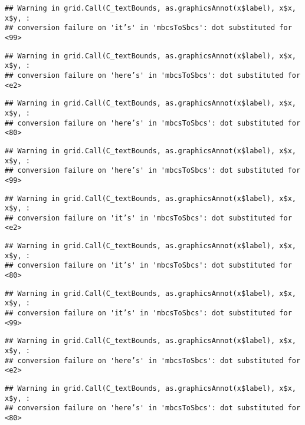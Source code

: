 \documentclass[
]{article}
\begin{document}
\begin{verbatim}
## Warning in grid.Call(C_textBounds, as.graphicsAnnot(x$label), x$x, x$y, :
## conversion failure on 'it’s' in 'mbcsToSbcs': dot substituted for <99>
\end{verbatim}

\begin{verbatim}
## Warning in grid.Call(C_textBounds, as.graphicsAnnot(x$label), x$x, x$y, :
## conversion failure on 'here’s' in 'mbcsToSbcs': dot substituted for <e2>
\end{verbatim}

\begin{verbatim}
## Warning in grid.Call(C_textBounds, as.graphicsAnnot(x$label), x$x, x$y, :
## conversion failure on 'here’s' in 'mbcsToSbcs': dot substituted for <80>
\end{verbatim}

\begin{verbatim}
## Warning in grid.Call(C_textBounds, as.graphicsAnnot(x$label), x$x, x$y, :
## conversion failure on 'here’s' in 'mbcsToSbcs': dot substituted for <99>
\end{verbatim}

\begin{verbatim}
## Warning in grid.Call(C_textBounds, as.graphicsAnnot(x$label), x$x, x$y, :
## conversion failure on 'it’s' in 'mbcsToSbcs': dot substituted for <e2>
\end{verbatim}

\begin{verbatim}
## Warning in grid.Call(C_textBounds, as.graphicsAnnot(x$label), x$x, x$y, :
## conversion failure on 'it’s' in 'mbcsToSbcs': dot substituted for <80>
\end{verbatim}

\begin{verbatim}
## Warning in grid.Call(C_textBounds, as.graphicsAnnot(x$label), x$x, x$y, :
## conversion failure on 'it’s' in 'mbcsToSbcs': dot substituted for <99>
\end{verbatim}

\begin{verbatim}
## Warning in grid.Call(C_textBounds, as.graphicsAnnot(x$label), x$x, x$y, :
## conversion failure on 'here’s' in 'mbcsToSbcs': dot substituted for <e2>
\end{verbatim}

\begin{verbatim}
## Warning in grid.Call(C_textBounds, as.graphicsAnnot(x$label), x$x, x$y, :
## conversion failure on 'here’s' in 'mbcsToSbcs': dot substituted for <80>
\end{verbatim}
\end{document}
